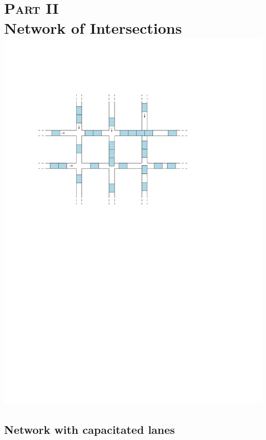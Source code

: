 \documentclass[a4paper]{report}
\theoremstyle{definition}
\theoremstyle{plain}
\begin{document}






\part*{\hspace{-0.8em}\textsc{Part II}\\[0.6em] Network of Intersections\\[3em]
       \centering\includegraphics[scale=1]{figures/network-intersections}}

\chapter{Network with capacitated lanes}\label{chap:network}
\end{document}
